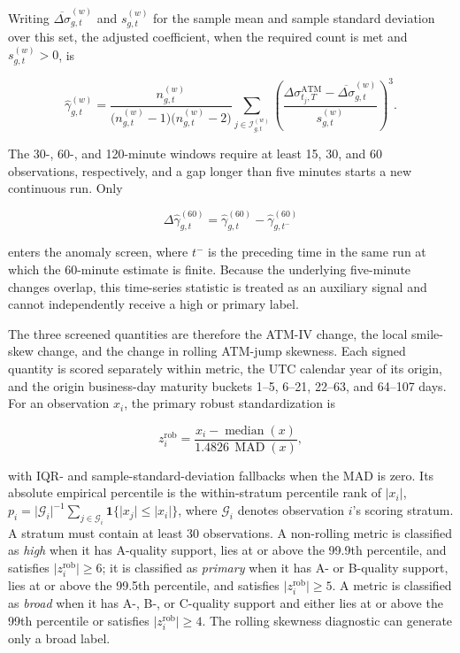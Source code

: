Writing $\overline{\Delta\sigma}^{(w)}_{g,t}$ and $s^{(w)}_{g,t}$ for the sample mean and sample standard deviation over this set, the adjusted coefficient, when the required count is met and $s^{(w)}_{g,t}>0$, is

\begin{equation}\label{eq:ch3:rolling_jump_skew_estimator}
\widehat\gamma^{(w)}_{g,t}
=
\frac{n^{(w)}_{g,t}}
{\bigl(n^{(w)}_{g,t}-1\bigr)\bigl(n^{(w)}_{g,t}-2\bigr)}
\sum_{j\in\mathcal I^{(w)}_{g,t}}
\left(
\frac{
\Delta\sigma^{\mathrm{ATM}}_{t_j,T}
-\overline{\Delta\sigma}^{(w)}_{g,t}
}{s^{(w)}_{g,t}}
\right)^3 .
\end{equation}

The 30-, 60-, and 120-minute windows require at least 15, 30, and 60 observations, respectively, and a gap longer than five minutes starts a new
continuous run. Only

\begin{equation}\label{eq:ch3:rolling_jump_skew_change}
\Delta\widehat\gamma^{(60)}_{g,t}
=
\widehat\gamma^{(60)}_{g,t}
-
\widehat\gamma^{(60)}_{g,t^-}
\end{equation}

enters the anomaly screen, where $t^-$ is the preceding time in the same run at which the 60-minute estimate is finite. Because the underlying five-minute changes overlap, this time-series statistic is treated as an auxiliary signal
and cannot independently receive a high or primary label.

The three screened quantities are therefore the ATM-IV change, the local smile-skew change, and the change in rolling ATM-jump skewness. Each signed quantity is scored separately within metric, the UTC calendar year of its origin, and the origin business-day maturity buckets 1--5, 6--21, 22--63, and 64--107 days. For an observation $x_i$, the primary robust standardization is

\begin{equation}\label{eq:ch3:robust_jump_score}
z^{\mathrm{rob}}_i
=
\frac{x_i-\operatorname{median}(x)}
{1.4826\,\operatorname{MAD}(x)},
\end{equation}

with IQR- and sample-standard-deviation fallbacks when the MAD is zero. Its absolute empirical percentile is the within-stratum percentile rank of
$\lvert x_i\rvert$, $p_i=\lvert\mathcal G_i\rvert^{-1}\sum_{j\in\mathcal G_i} \mathbf{1}\{\lvert x_j\rvert\leq\lvert x_i\rvert\}$, where $\mathcal G_i$ denotes observation $i$'s scoring stratum. A stratum must contain at least 30 observations. A non-rolling metric is classified as \emph{high} when it has A-quality support, lies at or above the
99.9th percentile, and satisfies $\lvert z^{\mathrm{rob}}_i\rvert\geq6$; it is
classified as \emph{primary} when it has A- or B-quality support, lies at or
above the 99.5th percentile, and satisfies
$\lvert z^{\mathrm{rob}}_i\rvert\geq5$. A metric is classified as \emph{broad}
when it has A-, B-, or C-quality support and either lies at or above the 99th
percentile or satisfies $\lvert z^{\mathrm{rob}}_i\rvert\geq4$. The rolling
skewness diagnostic can generate only a broad label.


